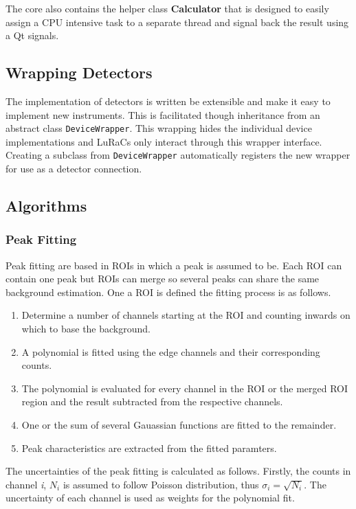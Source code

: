 The core also contains the helper class \textbf{Calculator} that is designed to easily assign a CPU intensive task to a separate thread and signal back the result using a Qt signals.

\subsection{Wrapping Detectors}
The implementation of detectors is written be extensible and make it easy to implement new instruments. This is facilitated though inheritance from an abstract class \texttt{DeviceWrapper}. This wrapping hides the individual device implementations and LuRaCs only interact through this wrapper interface. Creating a subclass from \texttt{DeviceWrapper} automatically registers the new wrapper for use as a detector connection. 

\subsection{Algorithms}
\subsubsection{Peak Fitting}
Peak fitting are based in ROIs in which a peak is assumed to be. Each ROI can contain one peak but ROIs can merge so several peaks can share the same background estimation. One a ROI is defined the fitting process is as follows.
\begin{enumerate}
    \item Determine a number of channels starting at the ROI and counting inwards on which to base the background.
    \item A polynomial is fitted using the edge channels and their corresponding counts.
    \item The polynomial is evaluated for every channel in the ROI or the merged ROI region and the result subtracted from the respective channels.
    \item One or the sum of several Gauassian functions are fitted to the remainder.
    \item Peak characteristics are extracted from the fitted paramters.
\end{enumerate}

The uncertainties of the peak fitting is calculated as follows. Firstly, the counts in channel \textit{i}, $N_i$ is assumed to follow Poisson distribution, thus $\sigma_i = \sqrt{N_i}$. The uncertainty of each channel is used as weights for the polynomial fit. 

